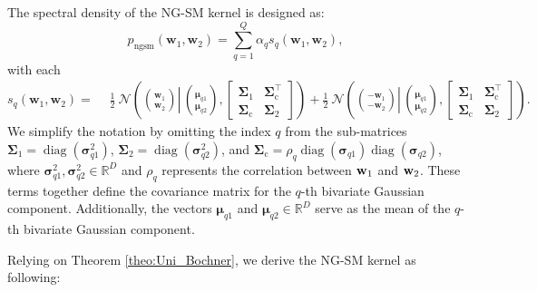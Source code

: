 The spectral density of the NG-SM kernel is designed as:
\begin{equation}
    p_{\text{ngsm}} \left(\mathbf{w}_1, \mathbf{w}_2\right)=\sum_{q=1}^{Q} \alpha_q s_q\left(\mathbf{w}_1, \mathbf{w}_2\right) ,
    \label{eq:ngsm_spectral}
\end{equation}
with each 
\begin{equation}
s_q\left(\mathbf{w}_1, \mathbf{w}_2\right)=
\begin{aligned}
  & \frac{1}{2} ~  \mathcal{N}\left(\left.\binom{\mathbf{w}_{1}}{\mathbf{w}_{2}} \right\rvert\,\binom{\boldsymbol{\mu}_{q1}}{\boldsymbol{\mu}_{q2}}, \begin{bmatrix}
      \bm \Sigma_{1}\!&\!\bm \Sigma_{\text{c}}^{\top} \\
    \bm \Sigma_{\text{c}}\!&\!\bm \Sigma_2
  \end{bmatrix} \right) +  \frac{1}{2} ~ \mathcal{N}\left(\left.\binom{-\mathbf{w}_{1}}{-\mathbf{w}_{2}} \right\rvert\,\binom{\boldsymbol{\mu}_{q1}}{\boldsymbol{\mu}_{q2}}, \begin{bmatrix}
      \bm \Sigma_{1}\!&\!\bm \Sigma_{\text{c}}^{\top} \\
    \bm \Sigma_{\text{c}}\!&\!\bm \Sigma_2
  \end{bmatrix} \right).
\end{aligned}
\end{equation}
We simplify the notation by omitting the index \(q\) from the sub-matrices \(\bm \Sigma_1 = \operatorname{diag}(\bm{\sigma}_{q1}^2)\), \(\bm \Sigma_2 = \operatorname{diag}(\bm{\sigma}_{q2}^2)\), and \(\bm \Sigma_{\mathrm{c}} = \rho_q \operatorname{diag}(\bm{\sigma}_{q1}) \operatorname{diag}(\bm{\sigma}_{q2})\), where \(\bm{\sigma}_{q1}^2, \bm{\sigma}_{q2}^2 \in \mathbb{R}^D\) and \(\rho_q\) represents the correlation between \({\mathbf w}_1\) and \({\mathbf w}_2\). These terms together define the covariance matrix for the \(q\)-th bivariate Gaussian component. Additionally, the vectors \(\bm{\mu}_{q1}\) and \(\bm{\mu}_{q2} \in \mathbb{R}^D\) serve as the mean of the \(q\)-th bivariate Gaussian component. 

Relying on Theorem \ref{theo:Uni_Bochner}, we derive the NG-SM kernel as following:

